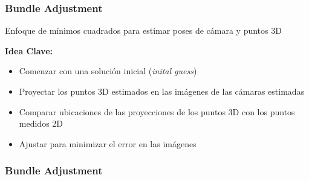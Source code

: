 \begin{frame}
    \frametitle{Bundle Adjustment}
    
    Enfoque de mínimos cuadrados para estimar poses de cámara y puntos 3D
    
    \textbf{Idea Clave:}
    \begin{itemize}
        \item Comenzar con una solución inicial (\emph{inital guess})
        \item Proyectar los puntos 3D estimados en las imágenes de las cámaras estimadas
        \item Comparar ubicaciones de las proyecciones de los puntos 3D con los puntos medidos 2D
        \item Ajustar para minimizar el error en las imágenes
    \end{itemize}
    
\end{frame}

\begin{frame}
    \frametitle{Bundle Adjustment}
    
    
\end{frame}


